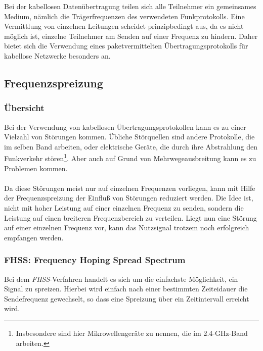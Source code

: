         Bei der kabellosen Datenübertragung teilen sich alle Teilnehmer ein gemeinsames Medium, nämlich die 
        Trägerfrequenzen des verwendeten Funkprotokolls. Eine Vermittlung von einzelnen Leitungen scheidet 
        prinzipbedingt aus, da es nicht möglich ist, einzelne Teilnehmer am Senden auf einer Frequenz zu 
        hindern. Daher bietet sich die Verwendung eines paketvermittelten Übertragungsprotokolls für kabellose
        Netzwerke besonders an.
        
    \subsection{Frequenzspreizung}
        \subsubsection{Übersicht}
            Bei der Verwendung von kabellosen Übertragungsprotokollen kann es zu einer Vielzahl von 
            Störungen kommen. Übliche Störquellen sind andere Protokolle, die im selben Band arbeiten,
            oder elektrische Geräte, die durch ihre Abstrahlung den Funkverkehr stören\footnote{Insbesondere
            sind hier Mikrowellengeräte zu nennen, die im 2.4-GHz-Band arbeiten.}. Aber auch auf Grund von 
            Mehrwegeausbreitung kann es zu Problemen kommen.\\
            \\
            Da diese Störungen meist nur auf einzelnen Frequenzen vorliegen, kann mit Hilfe der 
            Frequenzspreizung der Einfluß von Störungen reduziert werden. Die Idee ist, nicht mit
            hoher Leistung auf einer einzelnen Frequenz zu senden, sondern die Leistung auf einen
            breiteren Frequenzbereich zu verteilen. Liegt nun eine Störung auf einer einzelnen
            Frequenz vor, kann das Nutzsignal trotzem noch erfolgreich empfangen werden.

        \subsubsection{FHSS: Frequency Hoping Spread Spectrum}\label{FHSS}
            Bei dem \textsl{FHSS}-Verfahren handelt es sich um die einfachste Möglichkeit, ein
            Signal zu spreizen. Hierbei wird einfach nach einer bestimmten Zeiteidauer die
            Sendefrequenz gewechselt, so dass eine Spreizung über ein Zeitintervall erreicht wird.

